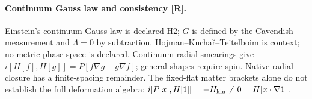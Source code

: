 
\paragraph{Continuum Gauss law and consistency [R].}
Einstein's continuum Gauss law is declared H2; $G$ is defined by the
Cavendish measurement and $\Lambda=0$ by subtraction. Hojman--Kucha\v r--Teitelboim
is context; no metric phase space is declared. Continuum radial smearings give
$i[H[f],H[g]]=P[f\nabla g-g\nabla f]$; general shapes require spin.
Native radial closure has a finite-spacing remainder. The fixed-flat matter
brackets alone do not establish the full deformation algebra:
$i[P[x],H[1]]=-H_{\rm kin}\ne0=H[x\cdot\nabla1]$.

